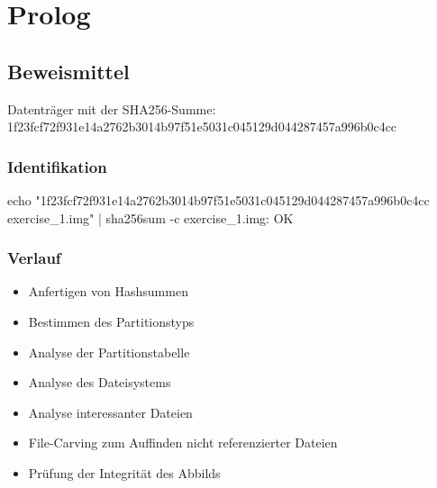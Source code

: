 \chapter{Prolog}

\section{Beweismittel}

Datenträger mit der SHA256-Summe:\\ 
1f23fcf72f931e14a2762b3014b97f51e5031c045129d044287457a996b0c4cc

\subsection{Identifikation}

echo "1f23fcf72f931e14a2762b3014b97f51e5031c045129d044287457a996b0c4cc exercise\_1.img" | sha256sum -c
exercise\_1.img: OK

\subsection{Verlauf}
	\begin{itemize}
	\item Anfertigen von Hashsummen
	\item Bestimmen des Partitionstyps
	\item Analyse der Partitionstabelle
	\item Analyse des Dateisystems
	\item Analyse interessanter Dateien
	\item File-Carving zum Auffinden nicht referenzierter Dateien
	\item Prüfung der Integrität des Abbilds
	\end{itemize}

